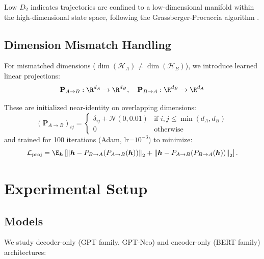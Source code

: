 \documentclass[10pt]{article} %
\theoremstyle{plain}
\theoremstyle{definition}
\theoremstyle{remark}
\newcommand{\cH}{\mathcal{H}}
\newcommand{\norm}[1]{\left\lVert#1\right\rVert}
\newcommand{\vect}[1]{\bm{#1}}
\newcommand{\mat}[1]{\mathbf{#1}}
\begin{document}
Low $D_2$ indicates trajectories are confined to a low-dimensional manifold within the high-dimensional state space, following the Grassberger-Procaccia algorithm \citep{grassberger1983}.

\subsection{Dimension Mismatch Handling}

For mismatched dimensions ($\dim(\cH_A) \neq \dim(\cH_B)$), we introduce learned linear projections:
\begin{equation}
    \mat{P}_{A \to B}: \R^{d_A} \to \R^{d_B}, \quad \mat{P}_{B \to A}: \R^{d_B} \to \R^{d_A}
\end{equation}

These are initialized near-identity on overlapping dimensions:
\begin{equation}
    (\mat{P}_{A \to B})_{ij} = \begin{cases}
        \delta_{ij} + \mathcal{N}(0, 0.01) & \text{if } i,j \leq \min(d_A, d_B) \\
        0 & \text{otherwise}
    \end{cases}
\end{equation}
and trained for 100 iterations (Adam, lr=$10^{-3}$) to minimize:
\begin{equation}
    \mathcal{L}_{\text{proj}} = \E_{\vect{h}}\left[\norm{\vect{h} - P_{B \to A}(P_{A \to B}(\vect{h}))}_2 + \norm{\vect{h} - P_{A \to B}(P_{B \to A}(\vect{h}))}_2\right].
\end{equation}

\section{Experimental Setup}

\subsection{Models}

We study decoder-only (GPT family, GPT-Neo) and encoder-only (BERT family) architectures:
\end{document}
